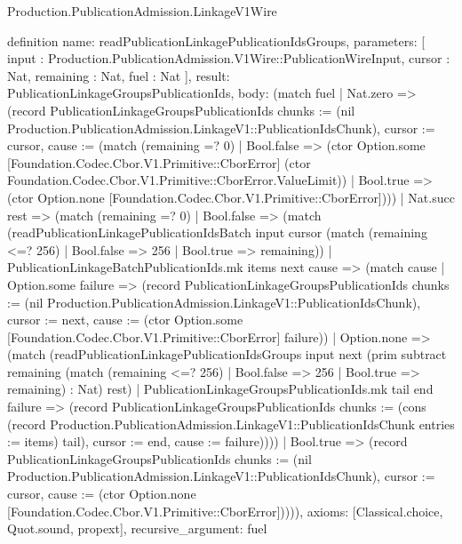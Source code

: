 \begin{lexlean}{Production.PublicationAdmission.LinkageV1Wire}
\begin{semanticmodule}
definition{
  name: readPublicationLinkagePublicationIdsGroups,
  parameters: [
    input : Production.PublicationAdmission.V1Wire::PublicationWireInput,
    cursor : Nat,
    remaining : Nat,
    fuel : Nat
  ],
  result: PublicationLinkageGroupsPublicationIds,
  body: (match fuel
    | Nat.zero => (record PublicationLinkageGroupsPublicationIds {chunks := (nil Production.PublicationAdmission.LinkageV1::PublicationIdsChunk), cursor := cursor, cause := (match (remaining =? 0)
      | Bool.false => (ctor Option.some [Foundation.Codec.Cbor.V1.Primitive::CborError] (ctor Foundation.Codec.Cbor.V1.Primitive::CborError.ValueLimit))
      | Bool.true => (ctor Option.none [Foundation.Codec.Cbor.V1.Primitive::CborError]))})
    | Nat.succ rest => (match (remaining =? 0)
      | Bool.false => (match (readPublicationLinkagePublicationIdsBatch input cursor (match (remaining <=? 256)
          | Bool.false => 256
          | Bool.true => remaining))
        | PublicationLinkageBatchPublicationIds.mk items next cause => (match cause
          | Option.some failure => (record PublicationLinkageGroupsPublicationIds {chunks := (nil Production.PublicationAdmission.LinkageV1::PublicationIdsChunk), cursor := next, cause := (ctor Option.some [Foundation.Codec.Cbor.V1.Primitive::CborError] failure)})
          | Option.none => (match (readPublicationLinkagePublicationIdsGroups input next (prim subtract remaining (match (remaining <=? 256)
              | Bool.false => 256
              | Bool.true => remaining) : Nat) rest)
            | PublicationLinkageGroupsPublicationIds.mk tail end failure => (record PublicationLinkageGroupsPublicationIds {chunks := (cons (record Production.PublicationAdmission.LinkageV1::PublicationIdsChunk {entries := items}) tail), cursor := end, cause := failure}))))
      | Bool.true => (record PublicationLinkageGroupsPublicationIds {chunks := (nil Production.PublicationAdmission.LinkageV1::PublicationIdsChunk), cursor := cursor, cause := (ctor Option.none [Foundation.Codec.Cbor.V1.Primitive::CborError])}))),
  axioms: [Classical.choice, Quot.sound, propext],
  recursive_argument: fuel
}


\end{semanticmodule}
\end{lexlean}
